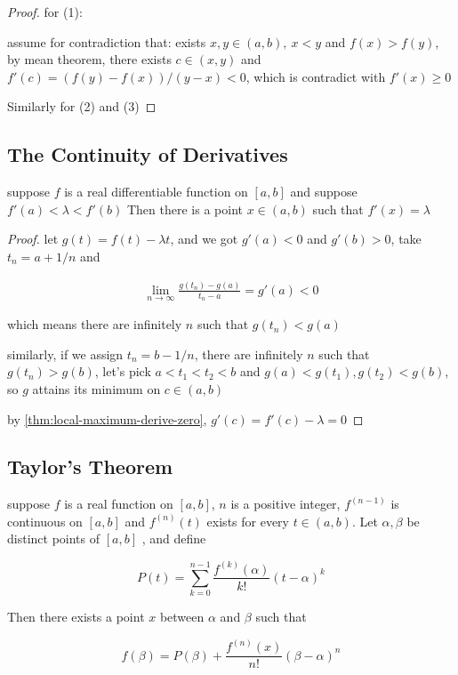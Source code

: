 \begin{proof}
    for (1):

    assume for contradiction that: exists $x,y \in (a,b),\: x < y$ and $f(x) > f(y)$, by mean theorem,
    there exists $c \in (x,y)$ and $f'(c) = (f(y) - f(x))/(y-x) < 0$, which is contradict with $f'(x) \ge 0$

    Similarly for (2) and (3)
\end{proof}

\subsection{The Continuity of Derivatives}

\begin{thm}
    suppose $f$ is a real differentiable function on $[a,b]$ and suppose
    $f'(a) < \lambda < f'(b)$ Then there is a point $x \in (a,b)$ such that
    $f'(x) = \lambda$
\end{thm}

\begin{proof}
    let $g(t) = f(t) - \lambda t$, and we got $g'(a) < 0$ and $g'(b) > 0$,
    take $t_n = a + 1/n$ and

    \begin{align*}
        \lim_{n \to \infty}\frac{g(t_n) - g(a)}{t_n - a} = g'(a) < 0
    \end{align*}

    which means there are infinitely $n$ such that $g(t_n) < g(a)$

    similarly, if we assign $t_n = b - 1/n$, there are infinitely $n$
    such that $g(t_n) > g(b)$, let's pick $a < t_1 < t_2 < b$ and 
    $g(a) < g(t_1), g(t_2) < g(b)$, so $g$ attains its minimum on $ c \in (a,b)$ 

    by  \autoref{thm:local-maximum-derive-zero}, $g'(c)= f'(c) - \lambda = 0$
\end{proof}




\subsection{Taylor's Theorem}

\begin{thm}
    suppose $f$ is a real function on $[a,b]$, $n$ is a positive integer,
    $f^{(n-1)}$ is continuous on $[a,b]$ and $f^{(n)}(t)$ exists
    for every $t \in (a,b)$. Let $\alpha, \beta$ be distinct points of $[a,b]$
    , and define

    \[
        P(t) = \sum_{k=0}^{n-1}\frac{f^{(k)}(\alpha)}{k!}(t-\alpha)^k
    \]

    Then there exists a point $x$ between $\alpha$ and $\beta$ such that

    \[
        f(\beta) = P(\beta) + \frac{f^{(n)}(x)}{n!}(\beta - \alpha)^n
    \]
\end{thm}

